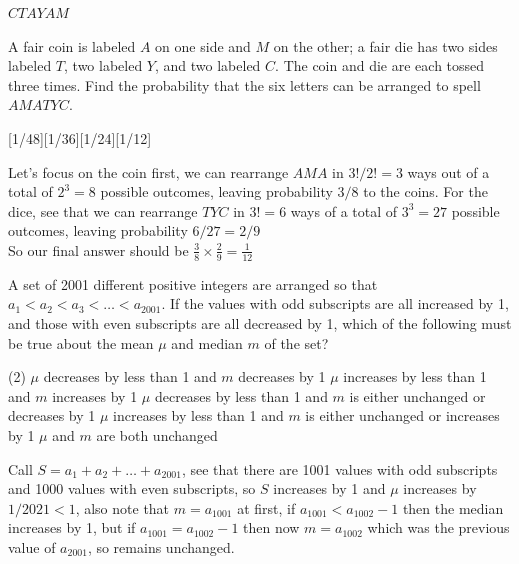 \documentclass[12pt]{article}
\newcounter{problem}
\begin{document}
\begin{solution}
      $CT\!AY\!\!AM$
\end{solution}

\begin{problem}
   A fair coin is labeled $A$ on one side and $M$ on the other; a fair die has two sides labeled $T$, two labeled $Y$, and two labeled $C$. The coin and die are each tossed three times. Find the probability that the six letters can be arranged to spell $AMATYC$.   
\end{problem}
[1/48][1/36][1/24][1/12]
\begin{solution}[E]
   Let's focus on the coin first, we can rearrange $AMA$ in $3!/2!=3$ ways out of a total of $2^3=8$ possible outcomes, leaving probability $3/8$ to the coins. For the dice, see that we can rearrange $TYC$ in $3!=6$ ways of a total of $3^3=27$ possible outcomes, leaving probability $6/27=2/9$\\
    So our final answer should be $\frac{3}{8} \times \frac{2}{9} = \frac{1}{12}$
\end{solution}

\begin{problem}
   A set of 2001 different positive integers are arranged so that $a_1 < a_2 < a_3 < \dots < a_{2001}$. If the values with odd subscripts are all increased by 1, and those with even subscripts are all decreased by 1, which of the following must be true about the mean $\mu$ and median $m$ of the set?
    \begin{tasks}[label=\Alph*., label-width=13pt, before-skip=2mm, after-skip=0mm](2)
        \task $\mu$ decreases by less than 1 and $m$ decreases by 1
        \task $\mu$ increases by less than 1 and $m$ increases by 1
        \task $\mu$ decreases by less than 1 and $m$ is either unchanged or decreases by 1
        \task $\mu$ increases by less than 1 and $m$ is either unchanged or increases by 1
        \task $\mu$ and $m$ are both unchanged
    \end{tasks} 
\end{problem}

\begin{solution}[D]
   Call $S=a_1+a_2+\ldots+a_{2001}$, see that there are 1001 values with odd subscripts and 1000 values with even subscripts, so $S$ increases by 1 and $\mu$ increases by $1/2021<1$, also note that $m=a_{1001}$ at first, if $a_{1001}<a_{1002}-1$ then the median increases by 1, but if $a_{1001}=a_{1002}-1$ then now $m=a_{1002}$ which was the previous value of $a_{2001}$, so remains unchanged.
\end{solution}
\end{document}
